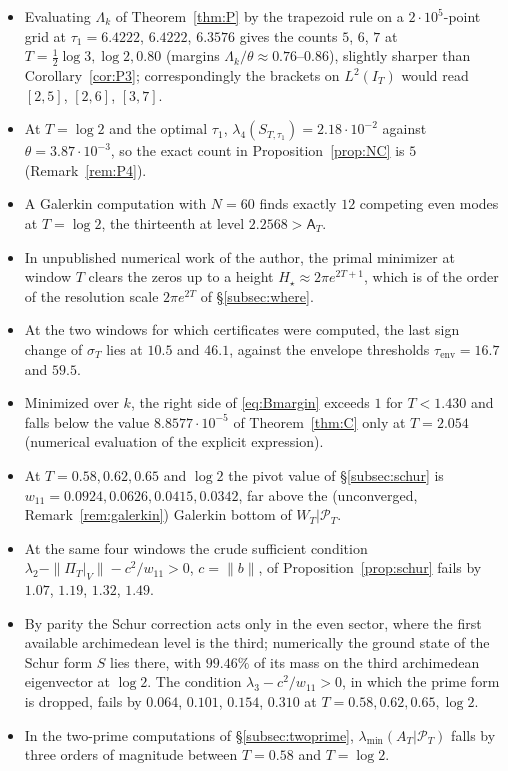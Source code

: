 \documentclass[11pt]{amsart}
\theoremstyle{definition}
\theoremstyle{remark}
\newcommand{\PT}{\mathcal P_T}
\newcommand{\IT}{I_T}
\newcommand{\lamA}{\lambda_{\min}(A_T|\PT)}
\newcommand{\sT}{\sigma_T}
\newcommand{\Aconst}{\mathsf A_T}
\newcommand{\PiT}{\Pi_T}
\begin{document}
\begin{itemize}
\item Evaluating $\Lambda_k$ of Theorem~\ref{thm:P} by the trapezoid rule on a $2\cdot10^5$-point grid at $\tau_1=6.4222$, $6.4222$, $6.3576$ gives the counts $5$, $6$, $7$ at $T=\frac12\log3,\log2,0.80$ (margins $\Lambda_k/\theta\approx0.76$--$0.86$), slightly sharper than Corollary~\ref{cor:P3}; correspondingly the brackets on $L^2(\IT)$ would read $[2,5]$, $[2,6]$, $[3,7]$.
\item At $T=\log2$ and the optimal $\tau_1$, $\lambda_4(S_{T,\tau_1})=2.18\cdot10^{-2}$ against $\theta=3.87\cdot10^{-3}$, so the exact count in Proposition~\ref{prop:NC} is $5$ (Remark~\ref{rem:P4}).
\item A Galerkin computation with $N=60$ finds exactly $12$ competing even modes at $T=\log2$, the thirteenth at level $2.2568>\Aconst$.
\item In unpublished numerical work of the author, the primal minimizer at window $T$ clears the zeros up to a height $H_\star\approx2\pi e^{2T+1}$, which is of the order of the resolution scale $2\pi e^{2T}$ of \S\ref{subsec:where}.
\item At the two windows for which certificates were computed, the last sign change of $\sT$ lies at $10.5$ and $46.1$, against the envelope thresholds $\tau_{\mathrm{env}}=16.7$ and $59.5$.
\item Minimized over $k$, the right side of \eqref{eq:Bmargin} exceeds $1$ for $T<1.430$ and falls below the value $8.8577\cdot10^{-5}$ of Theorem~\ref{thm:C} only at $T=2.054$ (numerical evaluation of the explicit expression).
\item At $T=0.58,0.62,0.65$ and $\log2$ the pivot value of \S\ref{subsec:schur} is $w_{11}=0.0924,0.0626,0.0415,0.0342$, far above the (unconverged, Remark~\ref{rem:galerkin}) Galerkin bottom of $W_T|\PT$.
\item At the same four windows the crude sufficient condition $\lambda_2-\|\PiT|_V\|-c^2/w_{11}>0$, $c=\|b\|$, of Proposition~\ref{prop:schur} fails by $1.07$, $1.19$, $1.32$, $1.49$.
\item By parity the Schur correction acts only in the even sector, where the first available archimedean level is the third; numerically the ground state of the Schur form $S$ lies there, with $99.46\%$ of its mass on the third archimedean eigenvector at $\log2$. The condition $\lambda_3-c^2/w_{11}>0$, in which the prime form is dropped, fails by $0.064$, $0.101$, $0.154$, $0.310$ at $T=0.58,0.62,0.65,\log2$.
\item In the two-prime computations of \S\ref{subsec:twoprime}, $\lamA$ falls by three orders of magnitude between $T=0.58$ and $T=\log2$.

\end{itemize}
\end{document}
